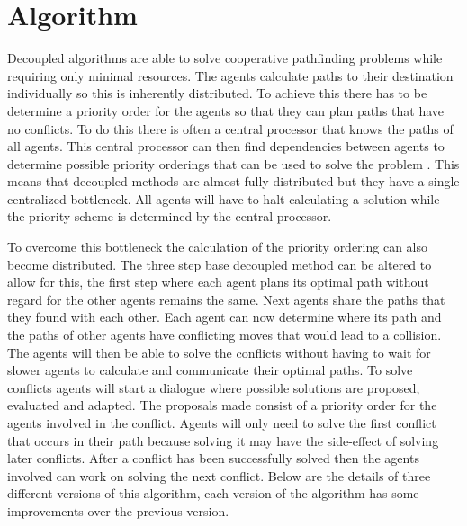 \section{Algorithm}\label{sec:method}
Decoupled algorithms are able to solve cooperative pathfinding problems while
requiring only minimal resources. The agents calculate paths to their
destination individually so this is inherently distributed. To achieve this
there has to be determine a  priority order for the agents so that they can
plan paths that have no conflicts. To do this there is often a central
processor that knows the paths of all agents. This central processor can then
find dependencies between agents to determine possible priority orderings that
can be used to solve the problem \cite{latombe1991,bennewitz2002}. This means
that decoupled methods are almost fully distributed but they have a single
centralized bottleneck. All agents will have to halt calculating a solution
while the priority scheme is determined by the central processor.

To overcome this bottleneck the calculation of the priority ordering can also
become distributed. The three step base decoupled method can be
altered to allow for this, the first step where each agent plans its optimal
path without regard for the other agents remains the same. Next agents share
the paths that they found with each other. Each agent can now determine where
its path and the paths of other agents
have conflicting moves that would lead to a collision. The agents will then be
able to solve the conflicts without having to wait for slower agents to
calculate and communicate their optimal paths. To solve conflicts agents will
start a dialogue where possible solutions are proposed, evaluated and adapted.
The proposals made consist of a priority order for the agents involved in the
conflict. Agents will only need to solve the first conflict that occurs in
their path because solving it may have the side-effect of solving later
conflicts. After a conflict has been successfully solved then the agents
involved can work on solving the next conflict.
Below are the details of three different versions of this algorithm, each
version of the algorithm has some improvements over the previous version.

